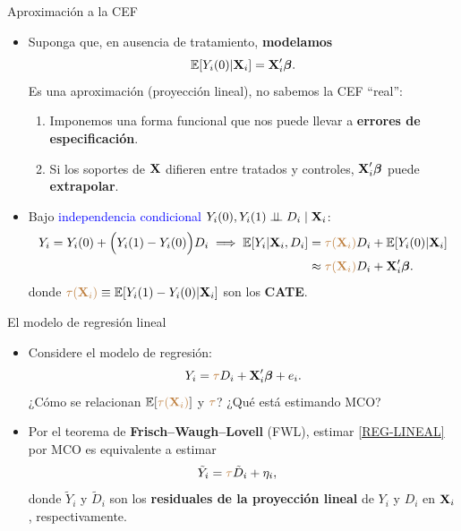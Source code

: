 \documentclass[10pt, xcolor=dvipsnames]{beamer}
\begin{document}
\begin{frame}{Aproximación a la CEF}
\begin{itemize}
    \item Suponga que, en ausencia de tratamiento, \textbf{modelamos}
    \vspace{-0.5em}
    \begin{align*}
        \operatorname{\mathbb{E}}[Y_i(0) | \textbf{X}_i] = \textbf{X}_i' \boldsymbol{\beta}.
    \end{align*}
    Es una aproximación (proyección lineal), no sabemos la CEF ``real'':
    \smallspace
    \begin{enumerate}
        \item Imponemos una forma funcional que nos puede llevar a \textbf{errores de especificación}. %
        \smallspace
        \item Si los soportes de \(\textbf{X}\) difieren entre tratados y controles, \(\textbf{X}_i'\boldsymbol{\beta}\) puede \textbf{extrapolar}. 
    \end{enumerate}  
    \vspace{1.0em}
    \item Bajo \textcolor{blue}{independencia condicional} \(Y_i(0),Y_i(1) \perp \!\!\! \perp D_i \mid \textbf{X}_i\):
    {\fontvid
    \begin{align*}
        \begin{split}
            Y_i = Y_i(0) + \Big(Y_i(1) - Y_i(0)\Big) D_i \implies \operatorname{\mathbb{E}} [Y_i | \textbf{X}_i, D_i] &= \textcolor{brown}{\tau(\textbf{X}_i)} D_i + \operatorname{\mathbb{E}}[Y_i(0) | \textbf{X}_i] \\
            &\approx \textcolor{brown}{\tau(\textbf{X}_i)} D_i + \textbf{X}'_i \boldsymbol{\beta}.
        \end{split}        
    \end{align*}
    }
    donde \(\textcolor{brown}{\tau(\textbf{X}_i)} \equiv \operatorname{\mathbb{E}}[Y_i(1) - Y_i(0) | \textbf{X}_i]\) son los \textbf{CATE}.
\end{itemize}
\end{frame}


\begin{frame}{El modelo de regresión lineal}
\begin{itemize}
    \item Considere el modelo de regresión:
    \begin{align}\label{REG-LINEAL}
        Y_i= \textcolor{brown}{\tau}D_i + \textbf{X}_i'\boldsymbol{\beta} + e_i.
    \end{align}
    ¿Cómo se relacionan \(\operatorname{\mathbb{E}}[\textcolor{brown}{\tau(\textbf{X}_i)}] \) y \(\textcolor{brown}{\tau}\)? ¿Qué está estimando MCO?
    \vspace{1em}
  \item Por el teorema de \textbf{Frisch–Waugh–Lovell} (FWL), estimar \eqref{REG-LINEAL} por MCO es equivalente a estimar
  \begin{align*}
      \tilde{Y}_i &= \textcolor{brown}{\tau} \tilde{D}_i + \eta_i,
  \end{align*}
  donde $\tilde Y_i$ y $\tilde D_i$ son los \textbf{residuales de la proyección lineal} de \(Y_i\) y \(D_i\) en \(\textbf{X}_i\), respectivamente.
\end{itemize}
\end{frame}
\end{document}
